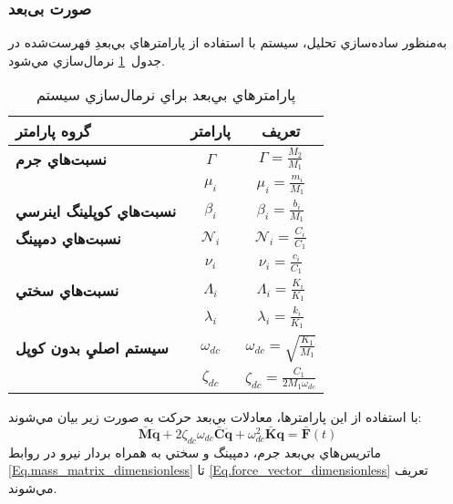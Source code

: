 \subsubsection{صورت بی‌بعد}
به‌منظور ساده‌سازي تحليل، سيستم با استفاده از پارامترهاي بي‌بعدِ فهرست‌شده در جدول~\ref{Tab:dimensionless.table} نرمال‌سازي مي‌شود.
\begin{table}[h!]
\centering
\caption{پارامترهاي بي‌بعد براي نرمال‌سازي سيستم}
\label{Tab:dimensionless.table}
\begin{tabular}{lcc}
\toprule
\textbf{گروه پارامتر} & \textbf{پارامتر} & \textbf{تعريف} \\
\midrule
\textbf{نسبت‌هاي جرم} & \( \Gamma \) & \( \Gamma = \frac{M_2}{M_1} \) \\
 & \( \mu_i \) & \( \mu_i = \frac{m_i}{M_1} \) \\
\addlinespace
\textbf{نسبت‌هاي كوپلينگ اينرسي} & \( \beta_i \) & \( \beta_i = \frac{b_i}{M_1} \) \\
\addlinespace
\textbf{نسبت‌هاي دمپينگ} & \( \mathcal{N}_i \) & \( \mathcal{N}_i = \frac{C_i}{C_1} \) \\
 & \( \nu_i \) & \( \nu_i = \frac{c_i}{C_1} \) \\
\addlinespace
\textbf{نسبت‌هاي سختي} & \( \Lambda_i \) & \( \Lambda_i = \frac{K_i}{K_1} \) \\
 & \( \lambda_i \) & \( \lambda_i = \frac{k_i}{K_1} \) \\
\addlinespace
\textbf{سيستم اصليِ بدون كوپل} & \( \omega_{dc} \) & \( \omega_{dc} = \sqrt{\frac{K_1}{M_1}} \) \\
 & \( \zeta_{dc} \) & \( \zeta_{dc} = \frac{C_1}{2 M_1 \omega_{dc}} \) \\
\bottomrule
\end{tabular}
\end{table}
با استفاده از اين پارامترها، معادلات بي‌بعد حركت به صورت زير بيان مي‌شوند:
\begin{equation}\label{Eq.EOM_dimensionless}
\mathbf{\bar{M}} \ddot{\mathbf{q}} + 2 \zeta_{dc} \omega_{dc} \mathbf{\bar{C}} \dot{\mathbf{q}} + \omega_{dc}^2 \mathbf{\bar{K}} \mathbf{q} = \mathbf{\bar{F}}(t)
\end{equation}
ماتريس‌هاي بي‌بعد جرم، دمپينگ و سختي به همراه بردار نيرو در روابط \eqref{Eq.mass_matrix_dimensionless} تا \eqref{Eq.force_vector_dimensionless} تعريف مي‌شوند.
